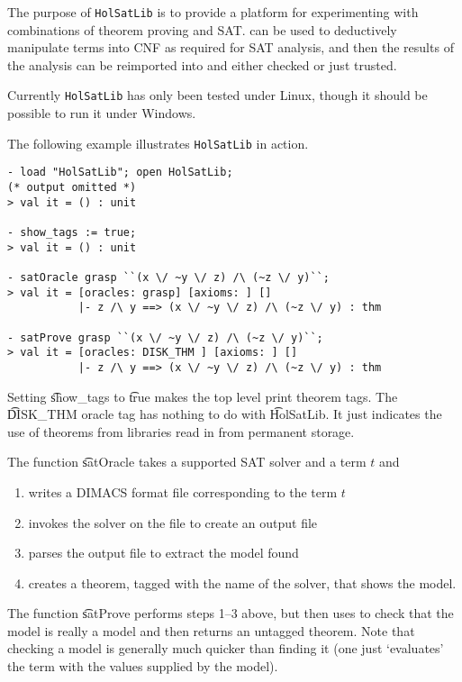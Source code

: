 The purpose of {\tt{HolSatLib}} is to provide a platform
for experimenting with combinations of theorem proving and
SAT. \HOL{} can be used to deductively manipulate terms into CNF as
required for SAT analysis, and then the results of the analysis
can be reimported into \HOL{} and either checked or just trusted.

Currently {\tt HolSatLib} has only been tested under Linux, though it should be
possible to run it under Windows.

The following example illustrates {\tt{HolSatLib}} in action.

\begin{session}\begin{verbatim}
- load "HolSatLib"; open HolSatLib;
(* output omitted *)
> val it = () : unit

- show_tags := true;
> val it = () : unit

- satOracle grasp ``(x \/ ~y \/ z) /\ (~z \/ y)``;
> val it = [oracles: grasp] [axioms: ] [] 
           |- z /\ y ==> (x \/ ~y \/ z) /\ (~z \/ y) : thm

- satProve grasp ``(x \/ ~y \/ z) /\ (~z \/ y)``;
> val it = [oracles: DISK_THM ] [axioms: ] [] 
           |- z /\ y ==> (x \/ ~y \/ z) /\ (~z \/ y) : thm
\end{verbatim}\end{session}

Setting \t{show\_tags} to \t{true} makes the \HOL{} top
level print theorem tags. The \t{DISK\_THM} oracle tag has nothing to do with \t{HolSatLib}. It just indicates the use of theorems from \HOL{} libraries read in from permanent storage. 

The function \t{satOracle}  takes a supported SAT solver and a term
$t$ and

\begin{enumerate}
\item writes a DIMACS format file corresponding to the term $t$
\item invokes the solver on the file to create an output file
\item parses the output file to extract the model found
\item creates a theorem, tagged with the name of the solver, that shows the model.
\end{enumerate}

The function \t{satProve}  performs steps 1--3 above, but then uses
\HOL{} to check that the model is really a model and then
returns an untagged theorem. Note that checking a model is
generally much quicker than finding it (one just `evaluates' the term
with the values supplied by the model).

